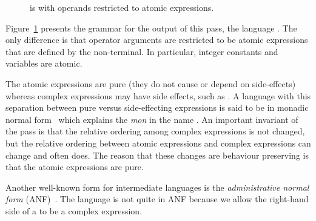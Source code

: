 \documentclass[7x10,nocrop]{TimesAPriori_MIT}%
\def\racketEd{0}
\def\pythonEd{1}
\def\edition{0}
\begin{document}
\begin{figure}[tp]
\centering
\fbox{
\begin{minipage}{0.96\textwidth}
{\if\edition\racketEd
\[
\begin{array}{l}
  \LvarMonadASTRacket \\
\begin{array}{rcl}
\LangVarANFM{}  &::=& \PROGRAM{\code{'()}}{\Exp}
\end{array}
\end{array}
\]
\fi}
{\if\edition\pythonEd
\[
\begin{array}{l}
  \LvarMonadASTPython \\
\begin{array}{rcl}
\LangVarANFM{}  &::=& \PROGRAM{}{\Stmt^{*}}
\end{array}
\end{array}
\]
\fi}  
\end{minipage}
}
\caption{\LangVarANF{} is \LangVar{} with operands restricted to
  atomic expressions.}
\label{fig:Lvar-anf-syntax}
\end{figure}

Figure~\ref{fig:Lvar-anf-syntax} presents the grammar for the output
of this pass, the language \LangVarANF{}. The only difference is that
operator arguments are restricted to be atomic expressions that are
defined by the \Atm{} non-terminal. In particular, integer constants
and variables are atomic.

The atomic expressions are pure (they do not cause or depend on
side-effects) whereas complex expressions may have side effects, such
as \READ{}.  A language with this separation between pure versus
side-effecting expressions is said to be in monadic normal
form~\citep{Moggi:1991in,Danvy:2003fk} which explains the \textit{mon}
in the name \LangVarANF{}. An important invariant of the
 pass is that the relative ordering
among complex expressions is not changed, but the relative ordering
between atomic expressions and complex expressions can change and
often does. The reason that these changes are behaviour preserving is
that the atomic expressions are pure.

Another well-known form for intermediate languages is the
\emph{administrative normal form}
(ANF)~\citep{Danvy:1991fk,Flanagan:1993cg}.
 
%
The \LangVarANF{} language is not quite in ANF because we allow the
right-hand side of a  to be a complex expression.
\end{document}
